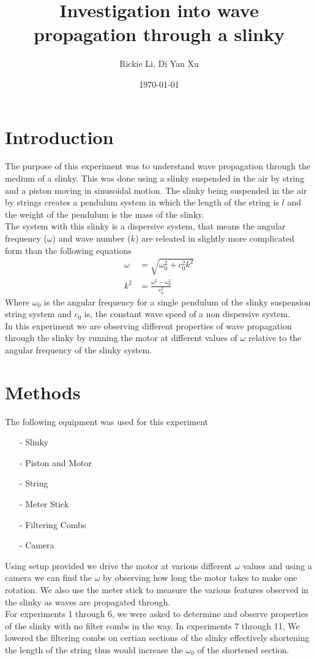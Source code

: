 \documentclass{article}
\title{Investigation into wave propagation through a slinky}
\author{Rickie Li, Di Yan Xu}
\date{\today}
\begin{document}
\maketitle

\newpage

\section{Introduction}
The purpose of this experiment was to understand wave propagation through the
medium of a slinky. This was done using a slinky suspended in the air by string
and a piston moving in sinusoidal motion. The slinky being suspended in the air
by strings creates a pendulum system in which the length of the string is $l$
and the weight of the pendulum is the mass of the slinky.\\
The system with this slinky is a dispersive system, that means the angular
frequency ($\omega$) and wave number ($k$) are releated in slightly more
complicated form than the following equations
\begin{align}
    \omega &= \sqrt{\omega_0^2 + c_0^2 k^2} \\
    k^2 &= \frac{\omega^2 - \omega_0^2}{c_0^2}
\end{align}
Where $\omega_0$ is the angular frequency for a single pendulum of the slinky
suspension string system and $c_0$ is, the constant wave speed of a
non dispersive system.\\
In this experiment we are observing different properties of wave propagation
through the slinky by running the motor at different values of $\omega$ relative
to the angular frequency of the slinky system.

\section{Methods}
The following equipment was used for this experiment
\begin{itemize}
    \item[-] Slinky
    \item[-] Piston and Motor
    \item[-] String
    \item[-] Meter Stick
    \item[-] Filtering Combs 
    \item[-] Camera
\end{itemize}
Using setup provided we drive the motor at various different $\omega$ values
and using a camera we can find the $\omega$ by observing how long the motor
takes to make one rotation. We also use the meter stick to measure the various
features observed in the slinky as waves are propagated through.\\
For experiments 1 through 6, we were asked to determine and observe properties
of the slinky with no filter combs in the way. In experiments 7 through 11, We
lowered the filtering combs on certian sections of the slinky effectively
shortening the length of the string thus would increase the $\omega_0$ of the
shortened section.
\newpage
\end{document}
